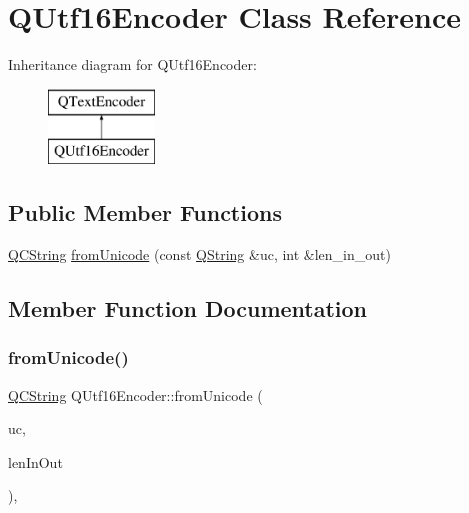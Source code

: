 \hypertarget{class_q_utf16_encoder}{}\section{Q\+Utf16\+Encoder Class Reference}
\label{class_q_utf16_encoder}
Inheritance diagram for Q\+Utf16\+Encoder\+:\begin{figure}[H]
\begin{center}
\leavevmode
\includegraphics[height=2.000000cm]{class_q_utf16_encoder}
\end{center}
\end{figure}
\subsection*{Public Member Functions}
\begin{DoxyCompactItemize}
\item 
\mbox{\hyperlink{class_q_c_string}{Q\+C\+String}} \mbox{\hyperlink{class_q_utf16_encoder_abe6f23ccae2a17021d4906e9f5e76ae6}{from\+Unicode}} (const \mbox{\hyperlink{class_q_string}{Q\+String}} \&uc, int \&len\+\_\+in\+\_\+out)
\end{DoxyCompactItemize}


\subsection{Member Function Documentation}
\mbox{\label{class_q_utf16_encoder_abe6f23ccae2a17021d4906e9f5e76ae6}} 
\subsubsection{\texorpdfstring{fromUnicode()}{fromUnicode()}}
{\footnotesize\ttfamily \mbox{\hyperlink{class_q_c_string}{Q\+C\+String}} Q\+Utf16\+Encoder\+::from\+Unicode (\begin{DoxyParamCaption}\item[{const \mbox{\hyperlink{class_q_string}{Q\+String}} \&}]{uc,  }\item[{int \&}]{len\+In\+Out }\end{DoxyParamCaption})\hspace{0.3cm}{\ttfamily [inline]}, {\ttfamily [virtual]}}


